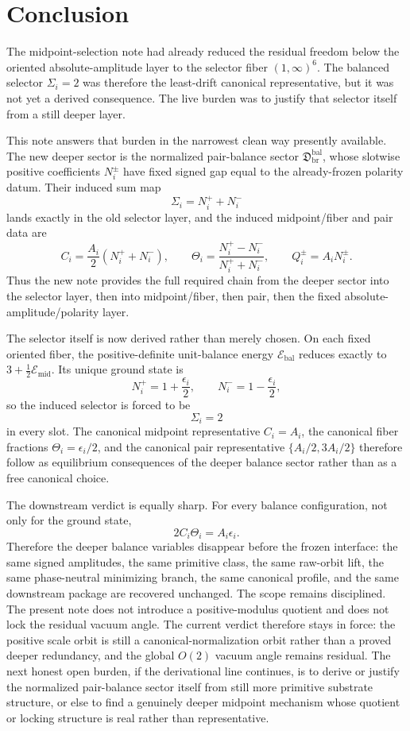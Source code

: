 \documentclass[11pt]{article}
\newcommand{\SelEnergy}{\mathscr E_{\mathrm{mid}}}
\newcommand{\MidBalanceSector}{\mathfrak D_{\mathrm{br}}^{\mathrm{bal}}}
\newcommand{\BalEnergy}{\mathscr E_{\mathrm{bal}}}
\begin{document}
\section{Conclusion}

The midpoint-selection note had already reduced the residual freedom below the oriented absolute-amplitude layer to the selector fiber \((1,\infty)^{6}\). The balanced selector \(\Sigma_i=2\) was therefore the least-drift canonical representative, but it was not yet a derived consequence. The live burden was to justify that selector itself from a still deeper layer.

This note answers that burden in the narrowest clean way presently available. The new deeper sector is the normalized pair-balance sector \(\MidBalanceSector\), whose slotwise positive coefficients \(N_i^{\pm}\) have fixed signed gap equal to the already-frozen polarity datum. Their induced sum map
\[
\Sigma_i=N_i^{+}+N_i^{-}
\]
lands exactly in the old selector layer, and the induced midpoint/fiber and pair data are
\[
C_i=\frac{A_i}{2}(N_i^{+}+N_i^{-}),
\qquad
\Theta_i=\frac{N_i^{+}-N_i^{-}}{N_i^{+}+N_i^{-}},
\qquad
Q_i^{\pm}=A_iN_i^{\pm}.
\]
Thus the new note provides the full required chain from the deeper sector into the selector layer, then into midpoint/fiber, then pair, then the fixed absolute-amplitude/polarity layer.

The selector itself is now derived rather than merely chosen. On each fixed oriented fiber, the positive-definite unit-balance energy \(\BalEnergy\) reduces exactly to \(3+\frac12\SelEnergy\). Its unique ground state is
\[
N_i^{+}=1+\frac{\epsilon_i}{2},
\qquad
N_i^{-}=1-\frac{\epsilon_i}{2},
\]
so the induced selector is forced to be
\[
\Sigma_i=2
\]
in every slot. The canonical midpoint representative \(C_i=A_i\), the canonical fiber fractions \(\Theta_i=\epsilon_i/2\), and the canonical pair representative \(\{A_i/2,3A_i/2\}\) therefore follow as equilibrium consequences of the deeper balance sector rather than as a free canonical choice.

The downstream verdict is equally sharp. For every balance configuration, not only for the ground state,
\[
2C_i\Theta_i=A_i\epsilon_i.
\]
Therefore the deeper balance variables disappear before the frozen interface: the same signed amplitudes, the same primitive class, the same raw-orbit lift, the same phase-neutral minimizing branch, the same canonical profile, and the same downstream package are recovered unchanged. The scope remains disciplined. The present note does not introduce a positive-modulus quotient and does not lock the residual vacuum angle. The current verdict therefore stays in force: the positive scale orbit is still a canonical-normalization orbit rather than a proved deeper redundancy, and the global \(O(2)\) vacuum angle remains residual. The next honest open burden, if the derivational line continues, is to derive or justify the normalized pair-balance sector itself from still more primitive substrate structure, or else to find a genuinely deeper midpoint mechanism whose quotient or locking structure is real rather than representative.
\end{document}

